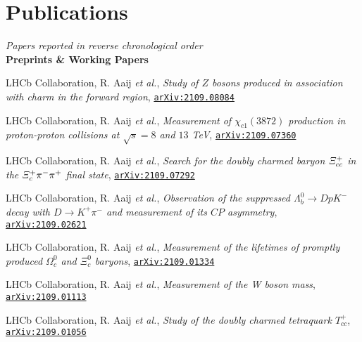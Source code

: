 \newcommand{\journal}[1]
  {\textbf{\large #1}\\\vspace{-5mm}}

\newcommand{\arxiv}[1]
  {\href{https://arxiv.org/abs/#1}{\texttt{arXiv:#1}}}


\section*{Publications}
\begin{cvcontent}
  \emph{Papers reported in reverse chronological order}\\[2.5mm]
  \journal{Preprints \& Working Papers}
  \begin{enumerate}[label={[\arabic*]}, leftmargin=1.5cm]
    \item LHCb Collaboration, R. Aaij \emph{et al.}, \emph{Study of $Z$ bosons produced in association with charm in the forward region}, \arxiv{2109.08084}
    \item LHCb Collaboration, R. Aaij \emph{et al.}, \emph{Measurement of $\chi_{c1}(3872)$ production in proton-proton collisions at $\sqrt{s}=8$ and $13$ TeV}, \arxiv{2109.07360}
    \item LHCb Collaboration, R. Aaij \emph{et al.}, \emph{Search for the doubly charmed baryon $\it{\Xi}_{cc}^{+}$ in the $\it{\Xi}_{c}^{+} \pi^{-} \pi^{+}$ final state}, \arxiv{2109.07292}
    \item LHCb Collaboration, R. Aaij \emph{et al.}, \emph{Observation of the suppressed $\Lambda_b^0\to D p K^-$ decay with $D\to K^+ \pi^-$ and measurement of its $C\!P$ asymmetry}, \arxiv{2109.02621}
    \item LHCb Collaboration, R. Aaij \emph{et al.}, \emph{Measurement of the lifetimes of promptly produced $\Omega^{0}_{c}$ and $\Xi^{0}_{c}$ baryons}, \arxiv{2109.01334}
    \item LHCb Collaboration, R. Aaij \emph{et al.}, \emph{Measurement of the W boson mass}, \arxiv{2109.01113}
    \sloppy
    \item LHCb Collaboration, R. Aaij \emph{et al.}, \emph{Study of the doubly charmed tetraquark $T_{cc}^+$}, \arxiv{2109.01056}

\end{enumerate}
\end{cvcontent}

